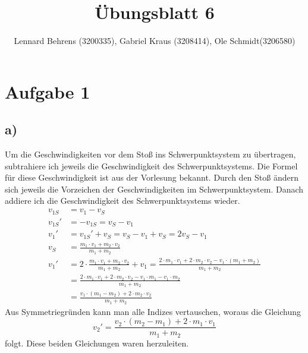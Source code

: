 \documentclass[a4paper,10pt]{extarticle}
\title{Übungsblatt 6}
\author{Lennard Behrens (3200335), Gabriel Kraus (3208414), Ole Schmidt(3206580)}
\begin{document}
\maketitle

\section*{Aufgabe 1}
\subsection*{a)}
Um die Geschwindigkeiten vor dem Stoß ins Schwerpunktsystem zu übertragen, subtrahiere ich jeweils die Geschwindigkeit des Schwerpunktsystems. Die Formel für diese Geschwindigkeit ist aus der Vorlesung bekannt. Durch den Stoß ändern sich jeweils die Vorzeichen der Geschwindigkeiten im Schwerpunktsystem. Danach addiere ich die Geschwindigkeit des Schwerpunktsystems wieder.
\begin{align*}
v_{1S}&=v_1-v_S\\
v_{1S}'&=-v_{1S}=v_S-v_1\\
v_1'&=v_{1S}'+v_S=v_S-v_1+v_S=2v_S-v_1\\
v_S&=\frac{m_1\cdot v_1+m_2\cdot v_2}{m_1+m_2}\\
v_1'&=2\cdot\frac{m_1\cdot v_1+m_2\cdot v_2}{m_1+m_2}+v_1=\frac{2\cdot m_1\cdot v_1+2\cdot m_2\cdot v_2-v_1\cdot(m_1+m_2)}{m_1+m_2}\\
&=\frac{2\cdot m_1\cdot v_1+2\cdot m_2\cdot v_2-v_1\cdot m_1-v_1\cdot m_2}{m_1+m_2}\\
&=\frac{v_1\cdot(m_1-m_2)+2\cdot m_2\cdot v_2}{m_1+m_2}
\end{align*}
Aus Symmetriegründen kann man alle Indizes vertauschen, woraus die Gleichung
\begin{equation*}
v_2'=\frac{v_2\cdot(m_2-m_1)+2\cdot m_1\cdot v_1}{m_1+m_2}
\end{equation*}
folgt. Diese beiden Gleichungen waren herzuleiten.
\end{document}

